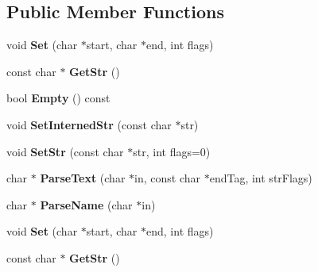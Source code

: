 \subsection*{Public Member Functions}
\begin{DoxyCompactItemize}
\item 
\mbox{\label{classtinyxml2_1_1StrPair_a4f05549373394266a1eecba26813c166}} 
void {\bfseries Set} (char $\ast$start, char $\ast$end, int flags)
\item 
\mbox{\label{classtinyxml2_1_1StrPair_ad87e3d11330f5e689ba1e7e54c023b57}} 
const char $\ast$ {\bfseries Get\+Str} ()
\item 
\mbox{\label{classtinyxml2_1_1StrPair_aca963a7eaa900bfddbea7312f040b39c}} 
bool {\bfseries Empty} () const
\item 
\mbox{\label{classtinyxml2_1_1StrPair_a2baf6230e18333e02ab65d0897ee3941}} 
void {\bfseries Set\+Interned\+Str} (const char $\ast$str)
\item 
\mbox{\label{classtinyxml2_1_1StrPair_a1f82ec6b5bee35ee7466d8565e43b1de}} 
void {\bfseries Set\+Str} (const char $\ast$str, int flags=0)
\item 
\mbox{\label{classtinyxml2_1_1StrPair_ad90521f188e9606a8fbafe5d86fb2246}} 
char $\ast$ {\bfseries Parse\+Text} (char $\ast$in, const char $\ast$end\+Tag, int str\+Flags)
\item 
\mbox{\label{classtinyxml2_1_1StrPair_aa6d8998efceba41d87ec2300c70a6085}} 
char $\ast$ {\bfseries Parse\+Name} (char $\ast$in)
\item 
\mbox{\label{classtinyxml2_1_1StrPair_a4f05549373394266a1eecba26813c166}} 
void {\bfseries Set} (char $\ast$start, char $\ast$end, int flags)
\item 
\mbox{\label{classtinyxml2_1_1StrPair_a27290a8fec20c0a6ccf9d8362f5c3b1d}} 
const char $\ast$ {\bfseries Get\+Str} ()
\item 
\mbox{\label{classtinyxml2_1_1StrPair_aca963a7eaa900bfddbea7312f040b39c}} 

\end{DoxyCompactItemize}
